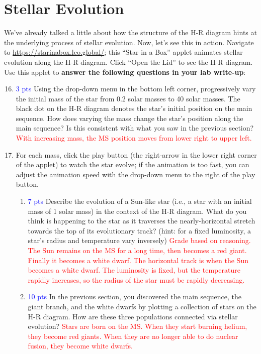\documentclass[11pt]{article}
\begin{document}
\section{Stellar Evolution}
We've already talked a little about how the structure of the H-R diagram hints at the underlying process of stellar evolution. Now, let's see this in action. Navigate to \url{https://starinabox.lco.global/}; this ``Star in a Box'' applet animates stellar evolution along the H-R diagram. Click ``Open the Lid'' to see the H-R diagram. Use this applet to \textbf{answer the following questions in your lab write-up}:
\begin{enumerate}
\setcounter{enumi}{15}

    \item \textcolor{blue}{3 pts} Using the drop-down menu in the bottom left corner, progressively vary the initial mass of the star from 0.2 solar masses to 40 solar masses. The black dot on the H-R diagram denotes the star's initial position on the main sequence. How does varying the mass change the star's position along the main sequence? Is this consistent with what you saw in the previous section?
    \textcolor{red}{With increasing mass, the MS position moves from lower right to upper left.}
    
    \item For each mass, click the play button (the right-arrow in the lower right corner of the applet) to watch the star evolve; if the animation is too fast, you can adjust the animation speed with the drop-down menu to the right of the play button.
    \begin{enumerate}
    
        \item \textcolor{blue}{7 pts} Describe the evolution of a Sun-like star (i.e., a star with an initial mass of 1 solar mass) in the context of the H-R diagram. What do you think is happening to the star as it traverses the nearly-horizontal stretch towards the top of its evolutionary track? (hint: for a fixed luminosity, a star's radius and temperature vary inversely)
        \textcolor{red}{Grade based on reasoning. The Sun remains on the MS for a long time, then becomes a red giant.  Finally it becomes a white dwarf.  The horizontal track is when the Sun becomes a white dwarf.  The luminosity is fixed, but the temperature rapidly increases, so the radius of the star must be rapidly decreasing.}
        
        \item \textcolor{blue}{10 pts} In the previous section, you discovered the main sequence, the giant branch, and the white dwarfs by plotting a collection of stars on the H-R diagram. How are these three populations connected via stellar evolution?
        \textcolor{red}{Stars are born on the MS.  When they start burning helium, they become red giants. When they are no longer able to do nuclear fusion, they become white dwarfs.}
        

\end{enumerate}
\end{enumerate}
\end{document}
